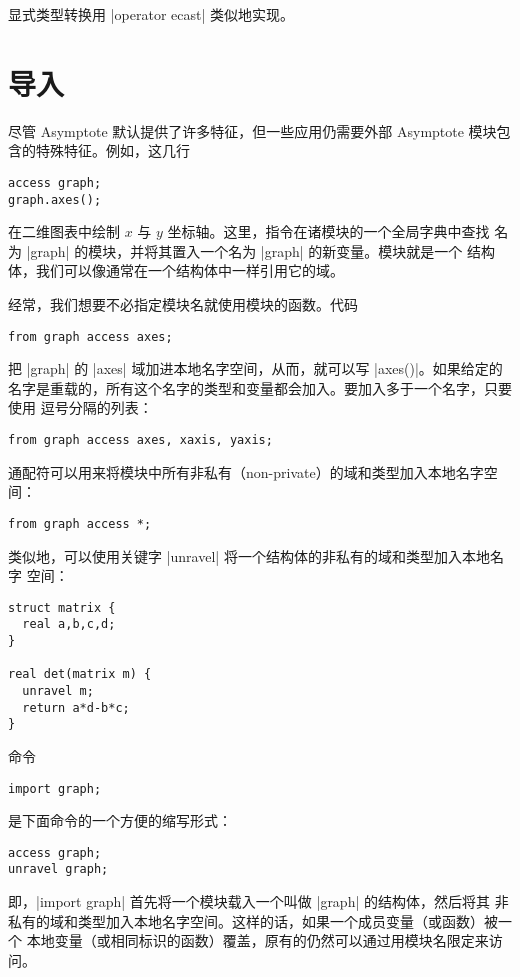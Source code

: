 \documentclass{ctexbook}
\newcommand*\prgname[1]{\textsf{#1}}
\begin{document}
{{{
显式类型转换用 |operator ecast| 类似地实现。



\section{导入}

尽管 \prgname{Asymptote} 默认提供了许多特征，但一些应用仍需要外部
\prgname{Asymptote} 模块包含的特殊特征。例如，这几行
\begin{lstlisting}
access graph;
graph.axes();
\end{lstlisting}
在二维图表中绘制 $x$ 与 $y$ 坐标轴。这里，指令在诸模块的一个全局字典中查找
名为 |graph| 的模块，并将其置入一个名为 |graph| 的新变量。模块就是一个
结构体，我们可以像通常在一个结构体中一样引用它的域。

经常，我们想要不必指定模块名就使用模块的函数。代码
\begin{lstlisting}
from graph access axes;
\end{lstlisting}
把 |graph| 的 |axes| 域加进本地名字空间，从而，就可以写 |axes()|。如果给定的
名字是重载的，所有这个名字的类型和变量都会加入。要加入多于一个名字，只要使用
逗号分隔的列表：
\begin{lstlisting}
from graph access axes, xaxis, yaxis;
\end{lstlisting}
通配符可以用来将模块中所有非私有（non-private）的域和类型加入本地名字空间：
\begin{lstlisting}
from graph access *;
\end{lstlisting}

类似地，可以使用关键字 |unravel| 将一个结构体的非私有的域和类型加入本地名字
空间：
\begin{lstlisting}
struct matrix {
  real a,b,c,d;
}

real det(matrix m) {
  unravel m;
  return a*d-b*c;
}
\end{lstlisting}

命令
\begin{lstlisting}
import graph;
\end{lstlisting}
是下面命令的一个方便的缩写形式：
\begin{lstlisting}
access graph;
unravel graph;
\end{lstlisting}

即，|import graph| 首先将一个模块载入一个叫做 |graph| 的结构体，然后将其
非私有的域和类型加入本地名字空间。这样的话，如果一个成员变量（或函数）被一个
本地变量（或相同标识的函数）覆盖，原有的仍然可以通过用模块名限定来访问。

}}}
\end{document}

